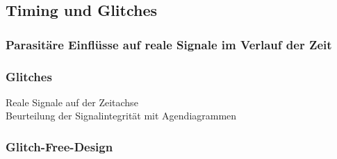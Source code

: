 \subsection{Timing und Glitches}

\subsubsection{Parasitäre Einflüsse auf reale Signale im Verlauf der Zeit}

\subsubsection{Glitches}
Reale Signale auf der Zeitachse\\
Beurteilung der Signalintegrität mit Agendiagrammen\\

\subsubsection{Glitch-Free-Design}